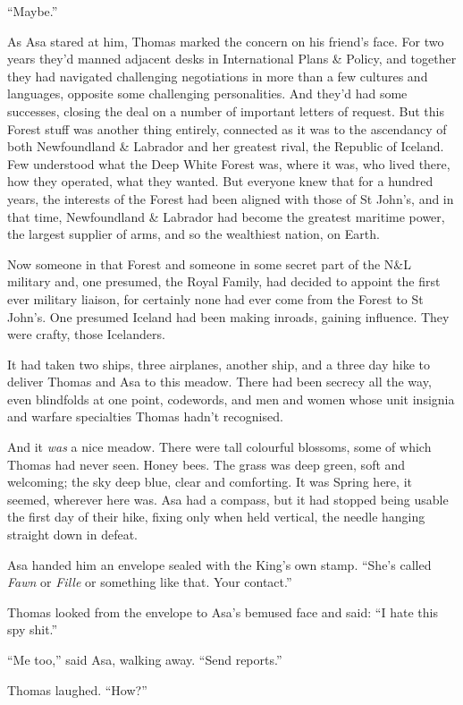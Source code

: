 \documentclass[11pt,a5paper]{article}
\begin{document}
``Maybe.''

As Asa stared at him, Thomas marked the concern on his friend's face. For two years they'd manned adjacent desks in International Plans \& Policy, and together they had navigated challenging negotiations in more than a few cultures and languages, opposite some challenging personalities. And they'd had some successes, closing the deal on a number of important letters of request. But this Forest stuff was another thing entirely, connected as it was to the ascendancy of both Newfoundland \& Labrador and her greatest rival, the Republic of Iceland. Few understood what the Deep White Forest was, where it was, who lived there, how they operated, what they wanted. But everyone knew that for a hundred years, the interests of the Forest had been aligned with those of St John's, and in that time, Newfoundland \& Labrador had become the greatest maritime power, the largest supplier of arms, and so the wealthiest nation, on Earth.

Now someone in that Forest and someone in some secret part of the N\&L military and, one presumed, the Royal Family, had decided to appoint the first ever military liaison, for certainly none had ever come from the Forest to St John's. One presumed Iceland had been making inroads, gaining influence. They were crafty, those Icelanders.

It had taken two ships, three airplanes, another ship, and a three day hike to deliver Thomas and Asa to this meadow. There had been secrecy all the way, even blindfolds at one point, codewords, and men and women whose unit insignia and warfare specialties Thomas hadn't recognised.

And it \emph{was} a nice meadow. There were tall colourful blossoms, some of which Thomas had never seen. Honey bees. The grass was deep green, soft and welcoming; the sky deep blue, clear and comforting. It was Spring here, it seemed, wherever here was. Asa had a compass, but it had stopped being usable the first day of their hike, fixing only when held vertical, the needle hanging straight down in defeat.

Asa handed him an envelope sealed with the King's own stamp. ``She's called \emph{Fawn} or \emph{Fille} or something like that. Your contact.''

Thomas looked from the envelope to Asa's bemused face and said: ``I hate this spy shit.''

``Me too,'' said Asa, walking away. ``Send reports.''

Thomas laughed. ``How?''
\end{document}

